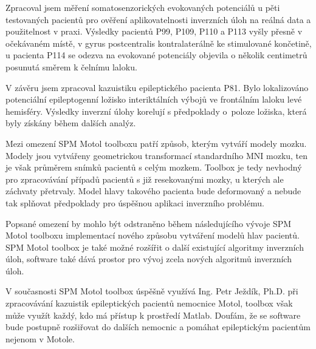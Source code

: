Zpracoval jsem měření somatosenzorických evokovaných potenciálů u pěti testovaných pacientů pro ověření aplikovatelnosti inverzních úloh na reálná data a použitelnost v praxi. Výsledky pacientů P99, P109, P110 a P113 vyšly přesně v očekávaném místě, v gyrus postcentralis kontralaterálně ke stimulované končetině, u pacienta P114 se odezva na evokované potenciály objevila o několik centimetrů posunutá směrem k čelnímu laloku.

V závěru jsem zpracoval kazuistiku epileptického pacienta P81. Bylo lokalizováno potenciální epileptogenní ložisko interiktálních výbojů ve frontálním laloku levé hemisféry. Výsledky inverzní úlohy korelují s předpoklady o~poloze ložiska, která byly získány během dalších analýz.

Mezi omezení SPM Motol toolboxu patří způsob, kterým vytváří modely mozku. Modely jsou vytvářeny geometrickou transformací standardního MNI mozku, ten je však průměrem snímků pacientů s celým mozkem. Toolbox je tedy nevhodný pro zpracovávání případů pacientů s již resekovanými mozky, u kterých ale záchvaty přetrvaly. Model hlavy takového pacienta bude deformovaný a nebude tak splňovat předpoklady pro úspěšnou aplikaci inverzního problému.

Popsané omezení by mohlo být odstraněno během následujícího vývoje SPM Motol toolboxu implementací nového způsobu vytváření modelů hlav pacientů. SPM Motol toolbox je také možné rozšířit o další existující algoritmy inverzních úloh, software také dává prostor pro vývoj zcela nových algoritmů inverzních úloh.

V současnosti SPM Motol toolbox úspěšně využívá Ing. Petr Ježdík, Ph.D. při zpracovávání kazuistik epileptických pacientů nemocnice Motol, toolbox však může využít každý, kdo má přístup k prostředí Matlab. Doufám, že se software bude postupně rozšiřovat do dalších nemocnic a pomáhat epileptickým pacientům nejenom v Motole.